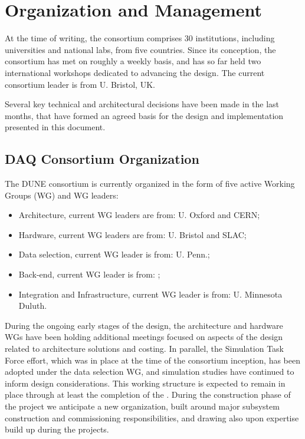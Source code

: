 
\section{Organization and Management}
\label{sec:fd-daq-org}

At the time of writing, the  consortium comprises \num{30} institutions, including universities and national labs, from five countries. Since its conception, the  consortium has met on roughly a weekly basis, and has so far held two international workshops dedicated to advancing the    design. The current  consortium leader is %
from U. Bristol, UK.

Several key technical and architectural decisions have been made in the last months, that have formed an agreed basis for the  design and implementation presented in this document.

\subsection{DAQ Consortium Organization}
\label{sec:fd-daq-org-consortium}

The DUNE  consortium is currently organized in the form of five active
Working Groups (WG) and WG leaders:
\begin{itemize}
\item Architecture, current WG leaders are from: U. Oxford and CERN;
\item Hardware, current WG leaders are from: U. Bristol and SLAC;
\item Data selection, current WG leader is from: U. Penn.;
\item Back-end, current WG leader is from: \fnal;
\item Integration and Infrastructure, current WG leader is from: U. Minnesota Duluth.
\end{itemize}

During the ongoing early stages of the design, the architecture and hardware WGs have been holding additional meetings focused on aspects of the design related to architecture solutions and costing. In parallel, the  Simulation Task Force effort, which was in place at the time of the consortium inception, has been adopted under the data selection WG, and simulation studies have continued to inform design considerations. This working structure is expected to remain in place through at least the completion of the . During the construction phase of the project we anticipate a new organization, built around major subsystem construction and commissioning responsibilities, and drawing also upon expertise build up during the  projects.

